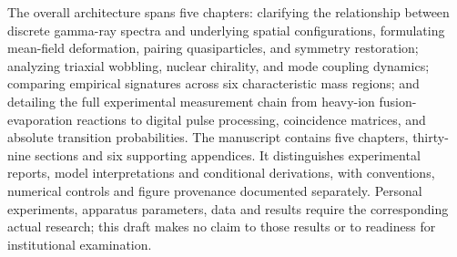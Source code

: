 The overall architecture spans five chapters: clarifying the relationship between discrete gamma-ray spectra and underlying spatial configurations, formulating mean-field deformation, pairing quasiparticles, and symmetry restoration; analyzing triaxial wobbling, nuclear chirality, and mode coupling dynamics; comparing empirical signatures across six characteristic mass regions; and detailing the full experimental measurement chain from heavy-ion fusion-evaporation reactions to digital pulse processing, coincidence matrices, and absolute transition probabilities. The manuscript contains five chapters, thirty-nine sections and six supporting appendices. It distinguishes experimental reports, model interpretations and conditional derivations, with conventions, numerical controls and figure provenance documented separately. Personal experiments, apparatus parameters, data and results require the corresponding actual research; this draft makes no claim to those results or to readiness for institutional examination.


\cleardoublepage\pagestyle{frontmatterstyle}%

